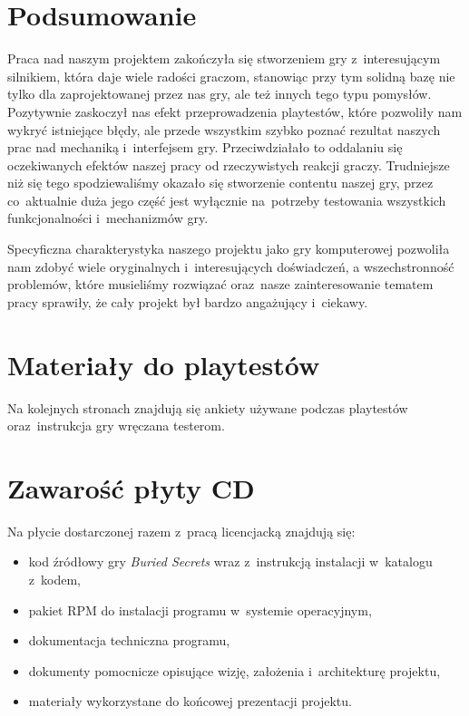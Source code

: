 \documentclass[licencjacka]{pracamgr}
\begin{document}
\chapter{Podsumowanie}
  Praca nad naszym projektem zakończyła się stworzeniem gry z~interesującym silnikiem, która daje wiele radości graczom,
  stanowiąc przy tym solidną bazę nie tylko dla zaprojektowanej przez nas gry, ale też innych tego typu pomysłów.
  Pozytywnie zaskoczył nas efekt przeprowadzenia playtestów, które pozwoliły nam wykryć istniejące błędy, 
  ale przede wszystkim szybko poznać rezultat naszych prac nad mechaniką i~interfejsem gry. Przeciwdziałało to oddalaniu
  się oczekiwanych efektów naszej pracy od rzeczywistych reakcji graczy. Trudniejsze niż się tego
  spodziewaliśmy okazało się stworzenie contentu naszej gry, przez co~aktualnie duża jego część jest wyłącznie na~potrzeby
  testowania wszystkich funkcjonalności i~mechanizmów gry. 

  Specyficzna charakterystyka naszego projektu jako gry komputerowej pozwoliła nam zdobyć wiele oryginalnych i~interesujących
  doświadczeń, a wszechstronność problemów, które musieliśmy rozwiązać oraz~nasze zainteresowanie tematem pracy sprawiły,
  że cały projekt był bardzo angażujący i~ciekawy.


\appendix

\chapter{Materiały do playtestów}
  Na kolejnych stronach znajdują się ankiety używane podczas playtestów
  oraz~instrukcja gry wręczana testerom.

   
   
   

\chapter{Zawarość płyty CD}
  Na płycie dostarczonej razem z~pracą licencjacką znajdują się:
  \begin{itemize}
   \item kod źródłowy gry \emph{Buried Secrets} wraz z~instrukcją instalacji w~katalogu z~kodem,
   \item pakiet RPM do instalacji programu w~systemie operacyjnym,
   \item dokumentacja techniczna programu,
   \item dokumenty pomocnicze opisujące wizję, założenia i~architekturę projektu,
   \item materiały wykorzystane do końcowej prezentacji projektu.
  \end{itemize}
\end{document}
